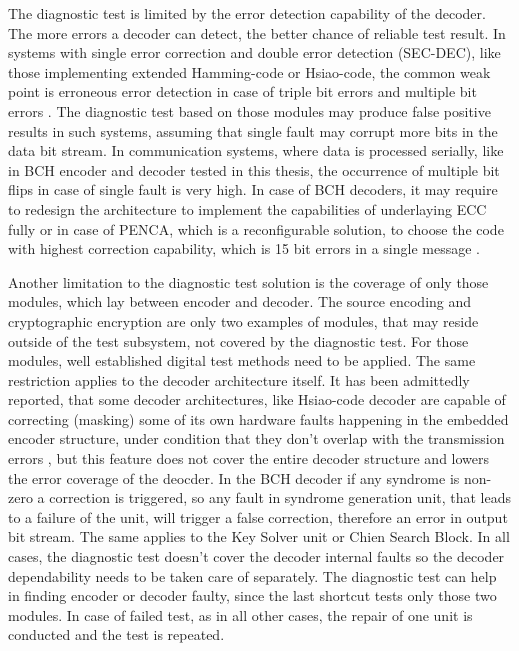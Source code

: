 The diagnostic test is limited by the error detection capability of the decoder. The more errors a decoder can detect, the better chance of reliable test result. In systems with single error correction and double error detection (SEC-DEC), like those implementing extended Hamming-code or Hsiao-code, the common weak point is erroneous error detection in case of triple bit errors and multiple bit errors \cite{art:Dicorato}. The diagnostic test based on those modules may produce false positive results in such systems, assuming that single fault may corrupt more bits in the data bit stream. In communication systems, where data is processed serially, like in BCH encoder and decoder tested in this thesis, the occurrence of multiple bit flips in case of single fault is very high. In case of BCH decoders, it may require to redesign the architecture to implement the capabilities of underlaying ECC fully or in case of PENCA, which is a reconfigurable solution, to choose the code with highest correction capability, which is 15 bit errors in a single message \cite{art:Pfeifer}.

Another limitation to the diagnostic test solution is the coverage of only those modules, which lay between encoder and decoder. The source encoding and cryptographic encryption are only two examples of modules, that may reside outside of the test subsystem, not covered by the diagnostic test. For those modules, well established digital test methods need to be applied. The same restriction applies to the decoder architecture itself. It has been admittedly reported, that some decoder architectures, like Hsiao-code decoder are capable of correcting (masking) some of its own hardware faults happening in the embedded encoder structure, under condition that they don't overlap with the transmission errors \cite{art:Dicorato}, but this feature does not cover the entire decoder structure and lowers the error coverage of the deocder. In the BCH decoder if any syndrome is non-zero a correction is triggered, so any fault in syndrome generation unit, that leads to a failure of the unit, will trigger a false correction, therefore an error in output bit stream. The same applies to the Key Solver unit or Chien Search Block. In all cases, the diagnostic test doesn't cover the decoder internal faults so the decoder dependability needs to be taken care of separately. The diagnostic test can help in finding encoder or decoder faulty, since the last shortcut tests only those two modules. In case of failed test, as in all other cases, the repair of one unit is conducted and the test is repeated.

